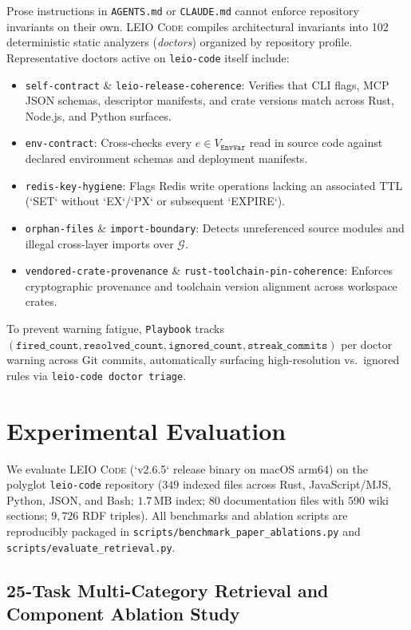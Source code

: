 \documentclass[11pt]{article}
\begin{document}
Prose instructions in \texttt{AGENTS.md} or \texttt{CLAUDE.md} cannot enforce repository invariants on their own. \textsc{LEIO Code} compiles architectural invariants into 102 deterministic static analyzers (\emph{doctors}) organized by repository profile. Representative doctors active on \texttt{leio-code} itself include:
\begin{itemize}
    \item \texttt{self-contract} \& \texttt{leio-release-coherence}: Verifies that CLI flags, MCP JSON schemas, descriptor manifests, and crate versions match across Rust, Node.js, and Python surfaces.
    \item \texttt{env-contract}: Cross-checks every $e \in V_{\texttt{EnvVar}}$ read in source code against declared environment schemas and deployment manifests.
    \item \texttt{redis-key-hygiene}: Flags Redis write operations lacking an associated TTL (`SET` without `EX`/`PX` or subsequent `EXPIRE`).
    \item \texttt{orphan-files} \& \texttt{import-boundary}: Detects unreferenced source modules and illegal cross-layer imports over $\mathcal{G}$.
    \item \texttt{vendored-crate-provenance} \& \texttt{rust-toolchain-pin-coherence}: Enforces cryptographic provenance and toolchain version alignment across workspace crates.
\end{itemize}
To prevent warning fatigue, \texttt{Playbook} tracks $(\texttt{fired\_count}, \texttt{resolved\_count}, \texttt{ignored\_count}, \texttt{streak\_commits})$ per doctor warning across Git commits, automatically surfacing high-resolution vs.\ ignored rules via \texttt{leio-code doctor triage}.

\section{Experimental Evaluation}
\label{sec:eval}

We evaluate \textsc{LEIO Code} (`v2.6.5` release binary on macOS arm64) on the polyglot \texttt{leio-code} repository ($349$ indexed files across Rust, JavaScript/MJS, Python, JSON, and Bash; $1.7\,\text{MB}$ index; $80$ documentation files with $590$ wiki sections; $9{,}726$ RDF triples). All benchmarks and ablation scripts are reproducibly packaged in \texttt{scripts/benchmark\_paper\_ablations.py} and \texttt{scripts/evaluate\_retrieval.py}.

\subsection{25-Task Multi-Category Retrieval and Component Ablation Study}
\end{document}
